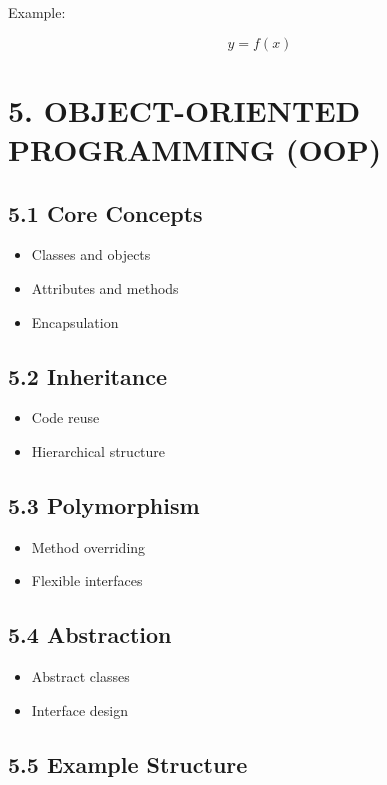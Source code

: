 Example:

\[
y = f(x)
\]

\vspace{0.5cm}

\section*{5. OBJECT-ORIENTED PROGRAMMING (OOP)}

\subsection*{5.1 Core Concepts}

\begin{itemize}
\item Classes and objects
\item Attributes and methods
\item Encapsulation
\end{itemize}

\subsection*{5.2 Inheritance}

\begin{itemize}
\item Code reuse
\item Hierarchical structure
\end{itemize}

\subsection*{5.3 Polymorphism}

\begin{itemize}
\item Method overriding
\item Flexible interfaces
\end{itemize}

\subsection*{5.4 Abstraction}

\begin{itemize}
\item Abstract classes
\item Interface design
\end{itemize}

\subsection*{5.5 Example Structure}

